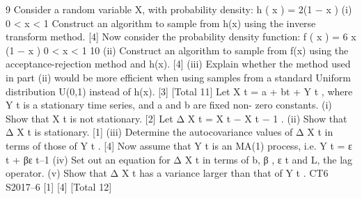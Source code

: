 \documentclass[a4paper,12pt]{article}
\begin{document}
\begin{enumerate}
9
Consider a random variable X, with probability density:
h ( x ) = 2(1 − x )
(i)
0 < x < 1
Construct an algorithm to sample from h(x) using the inverse transform
method.
[4]
Now consider the probability density function:
f ( x ) = 6 x (1 − x ) 0 < x < 1
10
(ii) Construct an algorithm to sample from f(x) using the acceptance-rejection
method and h(x).
[4]
(iii) Explain whether the method used in part (ii) would be more efficient when
using samples from a standard Uniform distribution U(0,1) instead of h(x). [3]
[Total 11]
Let X t = a + bt + Y t , where Y t is a stationary time series, and a and b are fixed non-
zero constants.
(i)
Show that X t is not stationary.
[2]
Let Δ X t = X t − X t − 1 .
(ii) Show that Δ X t is stationary. [1]
(iii) Determine the autocovariance values of Δ X t in terms of those of Y t . [4]
Now assume that Y t is an MA(1) process, i.e. Y t = ε t + βε t–1
(iv) Set out an equation for Δ X t in terms of b, β , ε t and L, the lag operator.
(v) Show that Δ X t has a variance larger than that of Y t .
CT6 S2017–6
[1]
[4]
[Total 12]


\end{enumerate}
\end{document}
